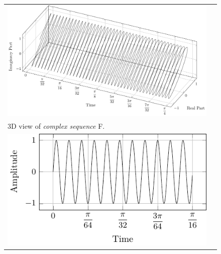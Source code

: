 \documentclass[../../course]{subfiles}
\begin{document}
\begin{figure} [H]

    \renewcommand{\arraystretch}{0.7}
    \centering
    \begin{NiceTabularX} {\textwidth} {
            *{2}{>{\centering\arraybackslash}X}
        }

         {
             {
                \includegraphics[height = \textheight] {tikzpics/plotComplexF.pdf}
            }
        }

        &
        \\

         {
            \vbox{
                 {3D view of \emph{complex sequence} F.}
                \label{plt:cmplxF}
            }
        }

        &
        \\

         {
             {
                \includegraphics[height = \textheight] {tikzpics/plotShortX2.pdf}
            }
        }

        &


\end{NiceTabularX}
\end{figure}
\end{document}

